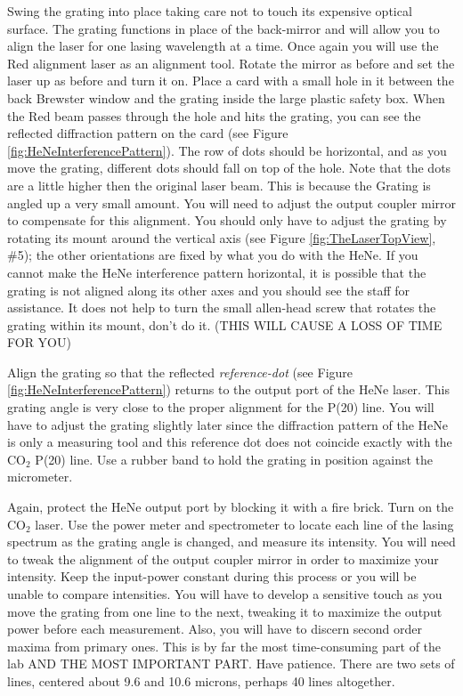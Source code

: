 \documentclass{../lab}
\begin{document}
\begin{enumerate}
    Swing the grating into place taking care not to touch its expensive optical surface. The grating functions in place of the back-mirror and will allow you to align the laser for one lasing wavelength at a time. Once again you will use the Red alignment laser as an alignment tool. Rotate the mirror as before and set the laser up as before and turn it on. Place a card with a small hole in it between the back Brewster window and the grating inside the large plastic safety box. When the Red beam passes through the hole and hits the grating, you can see the reflected diffraction pattern on the card (see Figure \ref{fig:HeNeInterferencePattern}). The row of dots should be horizontal, and as you move the grating, different dots should fall on top of the hole. Note that the dots are a little higher then the original laser beam. This is because the Grating is angled up a very small amount. You will need to adjust the output coupler mirror to compensate for this alignment. You should only have to adjust the grating by rotating its mount around the vertical axis (see Figure \ref{fig:TheLaserTopView}, \#5); the other orientations are fixed by what you do with the HeNe. If you cannot make the HeNe interference pattern horizontal, it is possible that the grating is not aligned along its other axes and you should see the staff for assistance. It does not help to turn the small allen-head screw that rotates the grating within its mount, don't do it. (THIS WILL CAUSE A LOSS OF TIME FOR YOU)
    
    Align the grating so that the reflected \emph{reference-dot} (see Figure \ref{fig:HeNeInterferencePattern}) returns to the output port of the HeNe laser. This grating angle is very close to the proper alignment for the P(20) line. You will have to adjust the grating slightly later since the diffraction pattern of the HeNe is only a measuring tool and this reference dot does not coincide exactly with the CO$_2$ P(20) line. Use a rubber band to hold the grating in position against the micrometer.
    
   
    
    Again, protect the HeNe output port by blocking it with a fire brick. Turn on the CO$_2$ laser. Use the power meter and spectrometer to locate each line of the lasing spectrum as the grating angle is changed, and measure its intensity. You will need to tweak the alignment of the output coupler mirror in order to maximize your intensity. Keep the input-power constant during this process or you will be unable to compare intensities. You will have to develop a sensitive touch as you move the grating from one line to the next, tweaking it to maximize the output power before each measurement. Also, you will have to discern second order maxima from primary ones. This is by far the most time-consuming part of the lab AND THE MOST IMPORTANT PART. Have patience. There are two sets of lines, centered about 9.6 and 10.6 microns, perhaps 40 lines altogether.
    

\end{enumerate}
\end{document}
